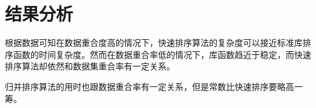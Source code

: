 \section{结果分析}

根据数据可知在数据重合度高的情况下，快速排序算法的复杂度可以接近标准库排序函数的时间复杂度。然而在数据重合率低的情况下，库函数趋近于稳定，而快速排序算法却依然和数据集重合率有一定关系。

归并排序算法的用时也跟数据重合率有一定关系，但是常数比快速排序要略高一筹。
